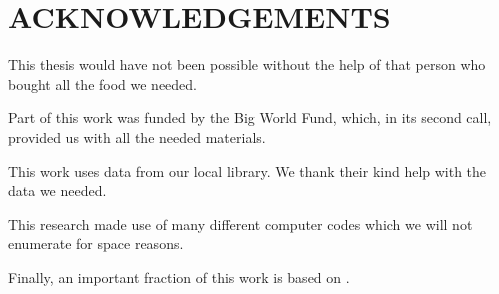 \chapter*{ACKNOWLEDGEMENTS} 

This thesis would have not been possible without the help of that
      person who bought all the food we needed.
      
      Part of this work was funded by the Big World Fund, which, in
      its second call, provided us with all the needed materials.
      
      This work uses data from our local library. We thank their
      kind help with the data we needed.
      
      This research made use of many different computer codes which
      we will not enumerate for space reasons.

      Finally, an important fraction of this work is based on \citet{1996ima..book.....C}.

%

